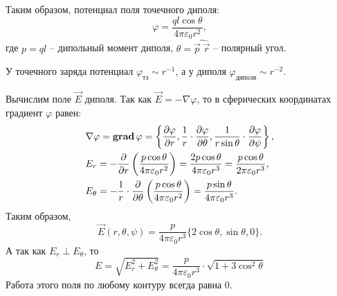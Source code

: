     Таким образом, потенциал поля точечного диполя:
    \[
        \varphi = \frac{ql\cos{\theta}}{4\pi\varepsilon_0 r^2},
    \]
    где \( p = ql \) -- дипольный момент диполя,
    \( \theta = \widehat{\vec{p}\;\vec{r}} \) -- полярный угол.
    
    \begin{remark}
        У точечного заряда потенциал \( \varphi_{\textit{тз}} \sim r^{-1} \), а 
        у диполя \( \varphi_{\textit{диполя}} \sim r^{-2} \).
    \end{remark}
    
    Вычислим поле \( \vec{E} \) диполя. Так как \( \vec{E} = -\nabla\varphi \), 
    то в сферических координатах градиент \( \varphi \) равен:
    \begin{align*}
        & \nabla\varphi = \mathbf{grad\,}{\varphi} =
        \left\{ \frac{\partial\varphi}{\partial r}, 
        \frac{1}{r}\cdot\frac{\partial\varphi}{\partial\theta}, 
        \frac{1}{r\sin{\theta}}\cdot\frac{\partial\varphi}{\partial\psi} 
        \right\}, \\
        & E_r = -\frac{\partial}{\partial r}
        \left(\frac{p\cos{\theta}}{4\pi\varepsilon_0 r^2}\right) = 
        \frac{2p\cos{\theta}}{4\pi\varepsilon_0 r^3} = 
        \frac{p\cos{\theta}}{2\pi\varepsilon_0 r^3}, \\
        & E_{\theta} = -\frac{1}{r}\cdot\frac{\partial}{\partial\theta}
        \left(\frac{p\cos{\theta}}{4\pi\varepsilon_0 r^2}\right) = 
        \frac{p\sin{\theta}}{4\pi\varepsilon_0 r^3}.
    \end{align*}
    Таким образом,
    \[
        \vec{E}(r, \theta, \psi) = \frac{p}{4\pi\varepsilon_0 r^3}
        \{ 2\cos\theta, \sin\theta, 0 \}.
    \]
    А так как \( E_r \perp E_{\theta} \), то
    \begin{equation}
        E = \sqrt{ E_r^2 + E_{\theta}^2 } = 
        \frac{p}{4\pi\varepsilon_0 r^3}\cdot\sqrt{ 1 + 3\cos^2\theta }
    \end{equation}
    Работа этого поля по любому контуру всегда равна 0.

